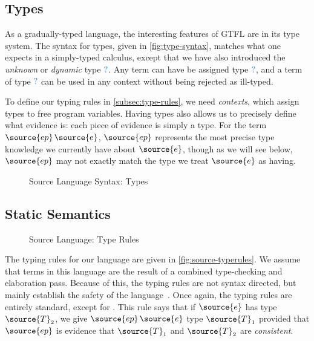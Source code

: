 \documentclass[11pt]{article}
\newcommand{\blue}[1]{ {\color{RoyalBlue}{{#1}}} }
\newcommand{\rrule}[1]{\rref*{#1}}
\begin{document}
\subsection{Types}
\label{subsec:source-types}

As a gradually-typed language, the interesting features of GTFL are in its type system.
The syntax for types, given in \autoref{fig:type-syntax}, matches what one expects in a simply-typed calculus, except that
we have also introduced the \textit{unknown} or \textit{dynamic} type $ \blue{?} $.
Any term can have be assigned type $ \blue{?} $, and a term of type $ \blue{?} $ can be used in
any context without being rejected as ill-typed.

To define our typing rules in \autoref{subsec:type-rules}, we need \textit{contexts}, which
assign types to free program variables. Having types also allows us to precisely define what evidence is:
each piece of evidence is simply a type. For the term $\source{ep} \, \source{e}$, $\source{ep}$ represents the most precise
type knowledge we currently have about $\source{e}$, though as we will see below,
$\source{ep}$ may not exactly match the type we treat $\source{e}$ as having.  


\begin{figure}[H]


	\caption{Source Language Syntax: Types}
	\label{fig:type-syntax}
\end{figure}

\subsection{Static Semantics}
\label{subsec:type-rules}

\begin{figure}[H]
	\ottdefnHastype{}
	\caption{Source Language: Type Rules}
	\label{fig:source-typerules}
\end{figure}

The typing rules for our language are given in \autoref{fig:source-typerules}.
We assume that terms in this language are the result of a combined type-checking
and elaboration pass. Because of this, the typing rules are not syntax directed,
but mainly establish the safety of the language~\citep{agt}.
Once again, the typing rules are entirely standard, except for \rrule{HastypeAscr}.
This rule says that if $\source{e}$ has type $\source{T}_{{\mathrm{2}}}$, we give $\source{ep} \, \source{e}$ type $\source{T}_{{\mathrm{1}}}$
provided that $\source{ep}$ is evidence that $\source{T}_{{\mathrm{1}}}$ and $\source{T}_{{\mathrm{2}}}$ are \textit{consistent}.
\end{document}
